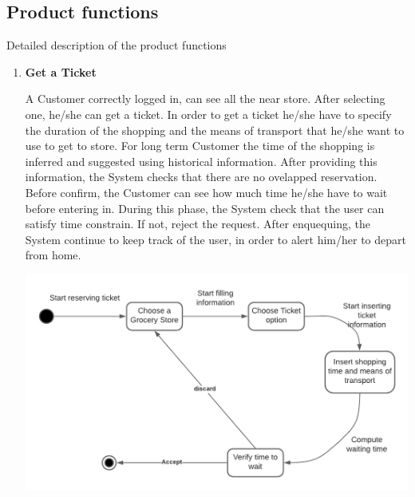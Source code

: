 \documentclass[a4paper, 10pt, oneside]{article}
\begin{document}
\subsection{Product functions}
Detailed description of the product functions

\begin{enumerate}
    \item \textbf{Get a Ticket}
    \begin{flushleft}
        A Customer correctly logged in, can see all the near store. After selecting one, he/she can get a ticket. In order to get a ticket he/she have to specify the duration of the shopping and the means of transport that he/she want to use to get to store. For long term Customer the time of the shopping is inferred and suggested using historical information.
        After providing this information, the System checks that there are no ovelapped reservation.
        Before confirm, the Customer can see how much time he/she have to wait before entering in. During this phase, the System check that the user can satisfy time constrain. If not, reject the request.
        After enquequing, the System continue to keep track of the user, in order to alert him/her to depart from home.
    \end{flushleft} 
        \begin{minipage}{\linewidth}
            \centering
           \includegraphics[height=0.3\textheight, scale=0.2, keepaspectratio]{img/Get_Ticket_diagram.png}
        \end{minipage}
    

\end{enumerate}
\end{document}
